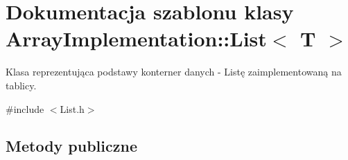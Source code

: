 \hypertarget{class_array_implementation_1_1_list}{\section{Dokumentacja szablonu klasy Array\-Implementation\-:\-:List$<$ T $>$}
\label{class_array_implementation_1_1_list}
}


Klasa reprezentująca podstawy konterner danych -\/ Listę zaimplementowaną na tablicy.  




{\ttfamily \#include $<$List.\-h$>$}

\subsection*{Metody publiczne}
